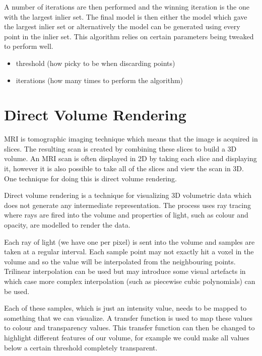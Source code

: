 A number of iterations are then performed and the winning iteration is the one with the largest inlier set. The final model is then either the model which gave the largest inlier set or alternatively the model can be generated using every point in the inlier set. This algorithm relies on certain parameters being tweaked to perform well.

\begin{itemize}
	\item threshold (how picky to be when discarding points)
	\item iterations (how many times to perform the algorithm)
\end{itemize}

\newpage
\section{Direct Volume Rendering}\label{background:volumerendering}
\cite{nvidia:volumerendering}
MRI is tomographic imaging technique which means that the image is acquired in slices. The resulting scan is created by combining these slices to build a 3D volume. An MRI scan is often displayed in 2D by taking each slice and displaying it, however it is also possible to take all of the slices and view the scan in 3D. One technique for doing this is direct volume rendering.

Direct volume rendering is a technique for visualizing 3D volumetric data which does not generate any intermediate representation. The process uses ray tracing where rays are fired into the volume and properties of light, such as colour and opacity, are modelled to render the data.

Each ray of light (we have one per pixel) is sent into the volume and samples are taken at a regular interval. Each sample point may not exactly hit a voxel in the volume and so the value will be interpolated from the neighbouring points. Trilinear interpolation can be used but may introduce some visual artefacts in which case more complex interpolation (such as piecewise cubic polynomials) can be used.

Each of these samples, which is just an intensity value, needs to be mapped to something that we can visualize. A transfer function is used to map these values to colour and transparency values. This transfer function can then be changed to highlight different features of our volume, for example we could make all values below a certain threshold completely transparent.

